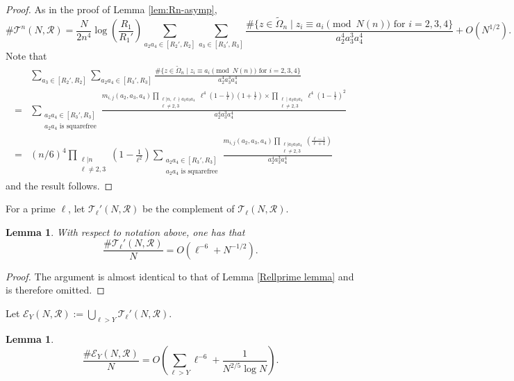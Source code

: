 \documentclass[table]{amsart}
\newtheorem{lemma}[theorem]{Lemma}
\numberwithin{equation}{section}
\begin{document}
\begin{proof}
As in the proof of Lemma \ref{lem:Rn-asymp}, 
\[\#\mathcal{T}^n(N,\mathscr{R})=\frac{N}{2 n^4}\log\!\left(\frac{R_1}{R_1'}\right)\sum_{a_2a_4\in [R_2',R_2]}\sum_{a_3\in [R_3',R_3]}\frac{\#\{z\in \widetilde{\Omega}_n\mid z_i\equiv a_i\pmod{N(n)}\text{ for }i=2,3,4\}}{a_2^4a_3^3a_4^4}+O(N^{1/2}).\]
Note that 
\[\begin{split}
    & \sum_{a_3\in [R_2',R_2]}\sum_{a_2a_4\in [R_3', R_3]}\frac{\#\{z\in \widetilde{\Omega}_n\mid z_i\equiv a_i\pmod{N(n)}\text{ for }i=2,3,4\}}{a_2^4 a_3^3 a_4^4}\\
    =& \sum_{\substack{a_2a_4\in [R_3', R_3]\\
    a_2a_4\text{ is squarefree}}}\frac{m_{i,j}(a_2,a_3,a_4)\prod_{\substack{\ell|n, \ell\nmid a_2 a_3 a_4\\ \ell\neq 2,3}}\ell^{4}\left(1-\frac{1}{\ell}\right)\left(1+\frac{1}{\ell}\right)\times \prod_{\substack{ \ell\mid a_2a_3a_4\\ \ell\neq 2,3}}\ell^4(1-\frac{1}{\ell})^2}{a_2^4 a_3^3 a_4^4}\\
    =& (n/6)^4\prod_{\substack{\ell|n\\\ell\neq 2,3}}\left(1-\frac{1}{\ell^2}\right)\sum_{\substack{a_2a_4\in [R_3', R_3]\\
    a_2a_4\text{ is squarefree}}}\frac{m_{i,j} (a_2,a_3,a_4)\prod_{\substack{\ell|a_2a_3a_4\\\ell\neq 2,3}}\left(\frac{\ell-1}{\ell+1}\right)}{a_2^4 a_3^3 a_4^4}
\end{split}\]and the result follows.
\end{proof}

For a prime $\ell$, let $\mathcal{T}_\ell'(N,\mathscr{R})$ be the complement of
$\mathcal{T}_\ell(N,\mathscr{R})$.

\begin{lemma}\label{Tell-tail}
With respect to notation above, one has that
\[
\frac{\#\mathcal{T}_\ell'(N,\mathscr{R})}{N}
=
O\!\left(\ell^{-6}+N^{-1/2}\right).
\]
\end{lemma}

\begin{proof}
The argument is almost identical to that of Lemma \ref{Rellprime lemma} and is therefore omitted.
\end{proof}

Let $\mathcal{E}_Y(N,\mathscr{R}):=\bigcup_{\ell>Y}\mathcal{T}_\ell'(N,\mathscr{R})$.

\begin{lemma}\label{T-tail}
\[
\frac{\#\mathcal{E}_Y(N,\mathscr{R})}{N}
=
O\!\left(\sum_{\ell>Y}\ell^{-6}+\frac{1}{N^{2/5}\log N}\right).
\]
\end{lemma}
\end{document}
